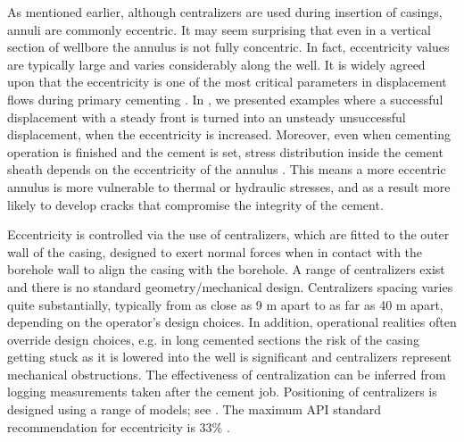 \documentclass[review]{elsarticle}
\begin{document}
As mentioned earlier, although centralizers are used during insertion of casings, annuli are commonly eccentric. It may seem surprising that even in a vertical section of wellbore the annulus is not fully concentric. In fact, eccentricity values are typically large and varies considerably along the well. It is widely agreed upon that the eccentricity is one of the most critical parameters in displacement flows during primary cementing \citep{nelson06}. In \cite{Maleki2018c}, we presented examples where a successful displacement with a steady front is turned into an unsteady unsuccessful displacement, when the eccentricity is increased. Moreover, even when cementing operation is finished and the cement is set, stress distribution inside the cement sheath depends on the eccentricity of the annulus \citep{Guillot2008}. This means a more eccentric annulus is more vulnerable to thermal or hydraulic stresses, and as a result more likely to develop cracks that compromise the integrity of the cement. 

Eccentricity is controlled via the use of centralizers, which are fitted to the outer wall of the casing, designed to exert normal forces when in contact with the borehole wall to align the casing with the borehole. A range of centralizers exist and there is no standard geometry/mechanical design. Centralizers spacing varies quite substantially, typically from as close as 9 m apart to as far as 40 m apart, depending on the operator's design choices. In addition, operational realities often override design choices, e.g. in long cemented sections the risk of the casing getting stuck as it is lowered into the well is significant and centralizers represent mechanical obstructions. The effectiveness of centralization can be inferred from logging measurements taken after the cement job. Positioning of centralizers is designed using a range of models; see \cite{juvkam1992,blanco2000,Guillot2008}. The maximum API standard recommendation for eccentricity is 33\% \citep{bottiglieri2014}. 
\end{document}
